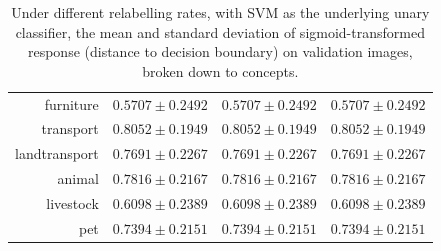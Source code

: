 \documentclass[11pt,a4paper]{article}
\begin{document}
\begin{table}[htbp]
\begin{tabular}{r|c|c|c}
furniture     & $0.5707\pm0.2492$ & $0.5707\pm0.2492$ & $0.5707\pm0.2492$\\
transport     & $0.8052\pm0.1949$ & $0.8052\pm0.1949$ & $0.8052\pm0.1949$\\
landtransport & $0.7691\pm0.2267$ & $0.7691\pm0.2267$ & $0.7691\pm0.2267$\\
animal        & $0.7816\pm0.2167$ & $0.7816\pm0.2167$ & $0.7816\pm0.2167$\\
livestock     & $0.6098\pm0.2389$ & $0.6098\pm0.2389$ & $0.6098\pm0.2389$\\
pet           & $0.7394\pm0.2151$ & $0.7394\pm0.2151$ & $0.7394\pm0.2151$
\end{tabular}
\caption{Under different relabelling rates, with SVM as the underlying unary classifier, the mean and standard deviation of sigmoid-transformed response (distance to decision boundary) on validation images, broken down to concepts.}
\label{tab:svmresp}
\end{table}
\end{document}
